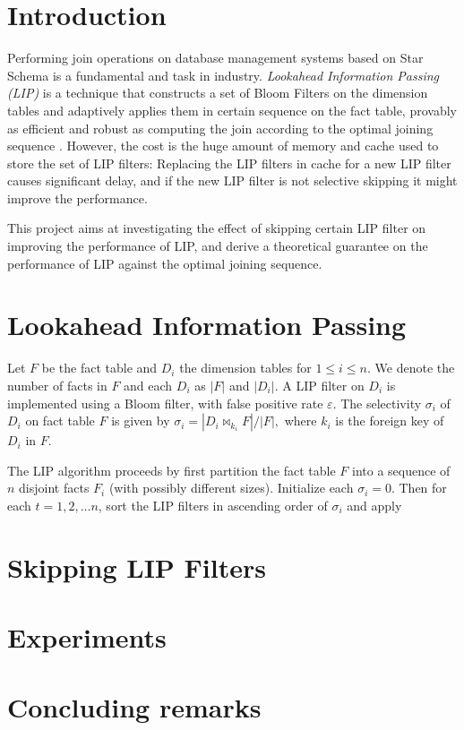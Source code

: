 \documentclass[11pt]{article}
\newcommand{\JOIN}{\bowtie}
\begin{document}
\newpage
\maketitle


\abstract{}


\section{Introduction}

Performing join operations on database management systems based on Star Schema is a fundamental and task in industry. \textit{Lookahead Information Passing (LIP)} is a technique that constructs a set of Bloom Filters on the dimension tables and adaptively applies them in certain sequence on the fact table, provably as efficient and robust as computing the join according to the optimal joining sequence \cite{zhu2017looking}. However, the cost is the huge amount of memory and cache used to store the set of LIP filters: Replacing the LIP filters in cache for a new LIP filter causes significant delay, and if the new LIP filter is not selective skipping it might improve the performance.

This project aims at investigating the effect of skipping certain LIP filter on improving the performance of LIP, and derive a theoretical guarantee on the performance of LIP against the optimal joining sequence.



\section{Lookahead Information Passing}

Let $F$ be the fact table and $D_i$ the dimension tables for $1 \leq i \leq n$. We denote the number of facts in $F$ and each $D_i$ as $|F|$ and $|D_i|$. A LIP filter on $D_i$ is implemented using a Bloom filter, with false positive rate $\varepsilon$. The selectivity $\sigma_i$ of $D_i$ on fact table $F$ is given by $\sigma_i = |D_i \JOIN_{k_i} F| / |F|,$ where $k_i$ is the foreign key of $D_i$ in $F$. 


The LIP algorithm proceeds by first partition the fact table $F$ into a sequence of $n$ disjoint facts $F_i$ (with possibly different sizes). Initialize each $\sigma_i = 0$. Then for each $t = 1, 2, \dots n$, sort the LIP filters in ascending order of $\sigma_i$ and apply 



\section{Skipping LIP Filters}


\section{Experiments}


\section{Concluding remarks}




{}

\end{document}
